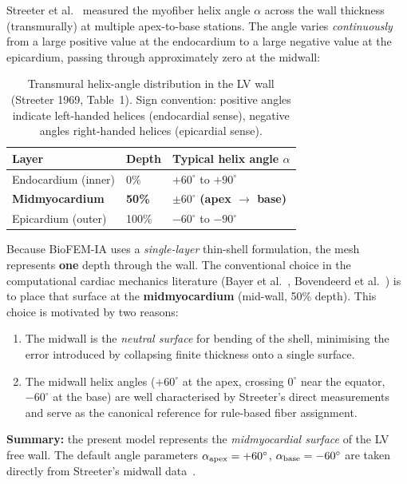 \documentclass[11pt,a4paper]{article}
\begin{document}
Streeter et al.~\cite{Streeter1969} measured the myofiber helix angle
$\alpha$ across the wall thickness (transmurally) at multiple apex-to-base
stations.  The angle varies \emph{continuously} from a large positive value at
the endocardium to a large negative value at the epicardium, passing through
approximately zero at the midwall:

\begin{table}[h]
\centering
\begin{tabular}{lll}
\toprule
Layer & Depth & Typical helix angle $\alpha$ \\
\midrule
Endocardium (inner) & 0\%   & $+60^\circ$ to $+90^\circ$ \\
\textbf{Midmyocardium} & \textbf{50\%} & \boldmath$\pm 60^\circ$ \textbf{(apex $\to$ base)} \\
Epicardium (outer)  & 100\% & $-60^\circ$ to $-90^\circ$ \\
\bottomrule
\end{tabular}
\caption{Transmural helix-angle distribution in the LV wall
         (Streeter 1969, Table~1).  Sign convention: positive angles indicate
         left-handed helices (endocardial sense), negative angles right-handed
         helices (epicardial sense).}
\label{tab:transmural}
\end{table}

Because BioFEM-IA uses a \emph{single-layer} thin-shell formulation, the mesh
represents \textbf{one} depth through the wall.  The conventional choice in the
computational cardiac mechanics literature
(Bayer et al.~\cite{Bayer2012}, Bovendeerd et al.~\cite{Bovendeerd1994})
is to place that surface at the \textbf{midmyocardium} (mid-wall, 50\% depth).
This choice is motivated by two reasons:
\begin{enumerate}
  \item The midwall is the \emph{neutral surface} for bending of the shell,
        minimising the error introduced by collapsing finite thickness onto a
        single surface.
  \item The midwall helix angles ($+60^\circ$ at the apex, crossing $0^\circ$
        near the equator, $-60^\circ$ at the base) are well characterised by
        Streeter's direct measurements and serve as the canonical reference
        for rule-based fiber assignment.
\end{enumerate}

\noindent
\textbf{Summary:} the present model represents the \emph{midmyocardial surface}
of the LV free wall.  The default angle parameters
$\alpha_{\rm apex} = +60^\circ$, $\alpha_{\rm base} = -60^\circ$ are taken
directly from Streeter's midwall data~\cite{Streeter1969}.
\end{document}
